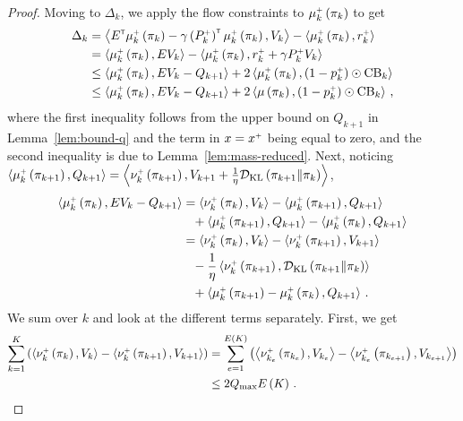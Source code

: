 \begin{proof}
    \noindent Moving to $\Delta_k$, we apply the flow constraints to $\mu_k^\upplus \spr{\pi_k}$ to get
    \begin{align*}
        \Delta_k &= \inp{\opE\transpose \mu_k^\upplus \spr{\pi_k} - \gamma \spr{\opPplusk}\transpose \mu_k^\upplus \spr{\pi_k}, V_k} - \inp{\mu_k^\upplus \spr{\pi_k}, r_k^\upplus} \\
        &= \inp{\mu_k^\upplus \spr{\pi_k}, \opE V_k} - \inp{\mu_k^\upplus \spr{\pi_k}, r_k^\upplus + \gamma \opPplusk V_k} \\
        &\leq \inp{\mu_k^\upplus \spr{\pi_k}, \opE V_k - Q_{k+1}} + 2 \inp{\mu_k^\upplus \spr{\pi_k}, \spr{1 - p_k^\upplus} \odot \CB_k} \\
        &\leq \inp{\mu_k^\upplus \spr{\pi_k}, \opE V_k - Q_{k+1}} + 2 \inp{\mu \spr{\pi_k}, \spr{1 - p_k^\upplus} \odot \CB_k}\,,
    \end{align*}
    where the first inequality follows from the upper bound on $Q_{k+1}$ in Lemma~\ref{lem:bound-q} and the term in $x = x^\upplus$ being equal to zero, and the second inequality is due to Lemma~\ref{lem:mass-reduced}. Next, noticing $\inp{\mu_k^\upplus \spr{\pi_{k+1}}, Q_{k+1}} = \inp{\nu_k^\upplus \spr{\pi_{k+1}}, V_{k+1} + \frac1\eta \KL \spr{\pi_{k+1} \| \pi_k}}$,
    \begin{align*}
        \inp{\mu_k^\upplus \spr{\pi_k}, \opE V_k - Q_{k+1}} &= \inp{\nu_k^\upplus \spr{\pi_k}, V_k} - \inp{\mu_k^\upplus \spr{\pi_{k+1}}, Q_{k+1}} \\
        &\phantom{=}+ \inp{\mu_k^\upplus \spr{\pi_{k+1}}, Q_{k+1}} - \inp{\mu_k^\upplus \spr{\pi_k}, Q_{k+1}} \\
        &= \inp{\nu_k^\upplus \spr{\pi_k}, V_k} - \inp{\nu_k^\upplus \spr{\pi_{k+1}}, V_{k+1}} \\
        &\phantom{=}- \frac1\eta \inp{\nu_k^\upplus \spr{\pi_{k+1}}, \KL \spr{\pi_{k+1} \| \pi_k}}  \\
        &\phantom{=}+ \inp{\mu_k^\upplus \spr{\pi_{k+1}} - \mu_k^\upplus \spr{\pi_k}, Q_{k+1}}\,.
    \end{align*}
    We sum over $k$ and look at the different terms separately. First, we get
    \begin{align*}
        \sumkK \spr{\inp{\nu_k^\upplus \spr{\pi_k}, V_k} - \inp{\nu_k^\upplus \spr{\pi_{k+1}}, V_{k+1}}} &= \sum_{e=1}^{E \spr{K}} \spr{\inp{\nu_{k_e}^\upplus \spr{\pi_{k_e}}, V_{k_e}} - \inp{\nu_{k_e}^\upplus \spr{\pi_{k_{e+1}}}, V_{k_{e+1}}}} \\
        &\leq 2 \VMAX E \spr{K}\,.

\end{align*}
\end{proof}
